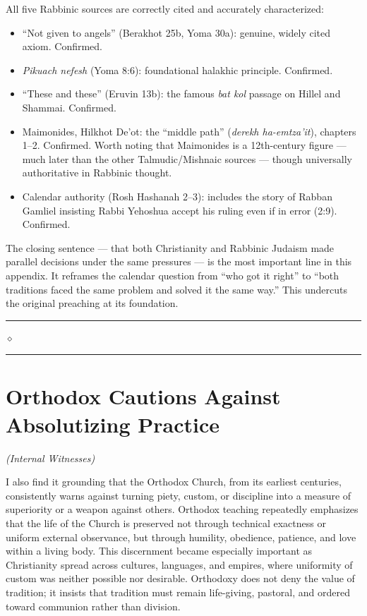 \documentclass[10pt,twoside,openany]{book}
\newcommand{\ornrule}{%
  \par\bigskip
  {\noindent\hfil{\color{gold}\rule[0.5ex]{1.5in}{0.5pt}%
  \quad$\diamond$\quad%
  \rule[0.5ex]{1.5in}{0.5pt}}\hfil\par}%
  \bigskip
}
\begin{document}
\begin{reviewerbox}
All five Rabbinic sources are correctly cited and
accurately characterized:

\begin{itemize}[leftmargin=1em,itemsep=2pt]
\item ``Not given to angels'' (Berakhot 25b, Yoma 30a): genuine, widely cited axiom. Confirmed.
\item \emph{Pikuach nefesh} (Yoma 8:6): foundational halakhic principle. Confirmed.
\item ``These and these'' (Eruvin 13b): the famous \emph{bat kol} passage on Hillel and Shammai. Confirmed.
\item Maimonides, Hilkhot De'ot: the ``middle path'' (\emph{derekh ha-emtza'it}), chapters 1--2. Confirmed. Worth noting that Maimonides is a 12th-century figure --- much later than the other Talmudic/Mishnaic sources --- though universally authoritative in Rabbinic thought.
\item Calendar authority (Rosh Hashanah 2--3): includes the story of Rabban Gamliel insisting Rabbi Yehoshua accept his ruling even if in error (2:9). Confirmed.
\end{itemize}

The closing sentence --- that both Christianity and
Rabbinic Judaism made parallel decisions under the
same pressures --- is the most important line in this
appendix. It reframes the calendar question from ``who
got it right'' to ``both traditions faced the same
problem and solved it the same way.'' This undercuts
the original preaching at its foundation.
\end{reviewerbox}

\ornrule



\chapter{Orthodox Cautions Against Absolutizing Practice}
\begin{center}
{\itshape (Internal Witnesses)}
\end{center}

I also find it grounding that the Orthodox Church, from its earliest
centuries, consistently warns against turning piety, custom, or
discipline into a measure of superiority or a weapon against others.
Orthodox teaching repeatedly emphasizes that the life of the Church is
preserved not through technical exactness or uniform external
observance, but through humility, obedience, patience, and love within
a living body. This discernment became especially important as
Christianity spread across cultures, languages, and empires, where
uniformity of custom was neither possible nor desirable. Orthodoxy does
not deny the value of tradition; it insists that tradition must remain
life-giving, pastoral, and ordered toward communion rather than
division.
\end{document}

